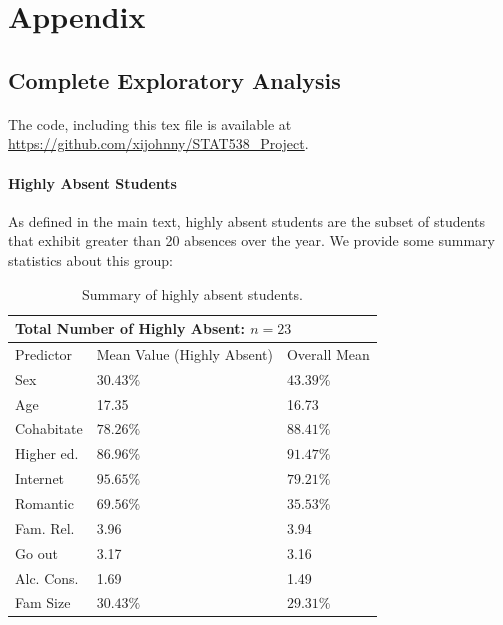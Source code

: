 \documentclass[12pt, titlepage]{article}
\begin{document}
	
	
	
	\newpage 
	
	\section*{Appendix}
	
	\subsection*{Complete Exploratory Analysis}
	
	\paragraph{} The code, including this tex file is available at \url{https://github.com/xijohnny/STAT538_Project}. 
	\paragraph{Highly Absent Students} As defined in the main text, highly absent students are the subset of students that exhibit greater than 20 absences over the year. We provide some summary statistics about this group:
	
	\begin{table}[h!]
		\centering
		\begin{tabular}{|l|l|l|}
			\multicolumn{3}{l}{Total Number of Highly Absent: $n = 23$} \\
			\hline
			Predictor & Mean Value (Highly Absent) & Overall Mean \\
			\hline
			Sex & $30.43\%$ & $43.39 \%$ \\
			Age & 17.35 & 16.73 \\
			Cohabitate & $78.26\%$ & $88.41\%$ \\
			Higher ed. & $86.96\%$ & $91.47\%$ \\
			Internet & $95.65\%$ & $79.21\%$ \\
			Romantic & $69.56\%$ & $35.53\%$ \\
			Fam. Rel. & 3.96 & 3.94 \\
			Go out & 3.17 & 3.16 \\
			Alc. Cons. & 1.69 & 1.49 \\
			Fam Size & $30.43\%$ & $29.31\%$\\
			\hline
		\end{tabular}
	\caption{Summary of highly absent students.}
	\end{table}
\end{document}
